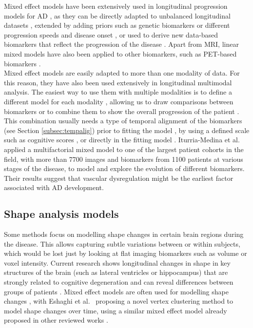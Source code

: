 Mixed effect models have been extensively used in longitudinal progression models for AD \cite{Bilgel2015a,Bilgel2016,Davatzikos2009,Koval2018,miriad,Platero2019,Schiratti2015,Villemagne2013,Ziegler2015b}, as they can be directly adapted to unbalanced longitudinal datasets \cite{Koval2018}, extended by adding priors such as genetic biomarkers \cite{Ziegler2015b} or different progression speeds and disease onset \cite{Schiratti2015}, or used to derive new data-based biomarkers that reflect the progression of the disease \cite{Bilgel2015a,Bilgel2016,Davatzikos2009,Platero2019}. Apart from MRI, linear mixed models have also been applied to other biomarkers, such as PET-based biomarkers \cite{Bilgel2016,Dodge2014}. \\

Mixed effect models are easily adapted to more than one modality of data. For this reason, they have also been used extensively in longitudinal multimodal analysis. The easiest way to use them with multiple modalities is to define a different model for each modality \cite{Dodge2014,Guerrero2016,Li2017c}, allowing us to draw comparisons between biomarkers \cite{Jedynak2012} or to combine them to show the overall progression of the patient \cite{Bilgel2015a,Bilgel2016,Donohue14,Jedynak2012,Li2017a}. This combination usually needs a type of temporal alignment of the biomarkers (see Section \ref{subsec:tempalig}) prior to fitting the model \cite{Guerrero2016}, by using a defined scale such as cognitive scores \cite{Yang2011}, or directly in the fitting model \cite{Li2017a}. Iturria-Medina et al.\ \cite{Iturria-Medina2016} applied a multifactorial mixed model to one of the largest patient cohorts in the field, with more than 7700 images and biomarkers from 1100 patients at various stages of the disease, to model and explore the evolution of different biomarkers. Their results suggest that vascular dysregulation might be the earliest factor associated with AD development. 

\subsection{Shape analysis models}

Some methods focus on modelling shape changes in certain brain regions during the disease. This allows capturing subtle variations between or within subjects, which would be lost just by looking at flat imaging biomarkers such as volume or voxel intensity. Current research shows longitudinal changes in shape in key structures of the brain (such as lateral ventricles or hippocampus) that are strongly related to cognitive degeneration \cite{Gui2017,Tang2015} and can reveal differences between groups of patients \cite{Bone2017,Bone2018,Gutman2013}. Mixed effect models are often used for modelling shape changes \cite{Bone2017,Bone2018,Gui2017,Tang2015}, with Eshaghi et al.\ \cite{Eshaghi2017} proposing a novel vertex clustering method to model shape changes over time, using a similar mixed effect model already proposed in other reviewed works \cite{Donohue14,Jedynak2012,Schiratti2015}.

